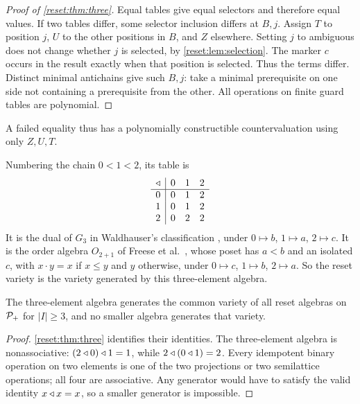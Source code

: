 \begin{proof}[Proof of \cref{reset:thm:three}]
Equal tables give equal selectors and therefore equal values.
If two tables differ, some selector inclusion differs at $B,j$.
Assign $T$ to position $j$, $U$ to the other positions in $B$, and $Z$
elsewhere. Setting $j$ to ambiguous does not change whether $j$ is
selected, by \cref{reset:lem:selection}. The marker $c$ occurs in the
result exactly when that position is selected. Thus the terms differ.
Distinct minimal antichains give such $B,j$: take a minimal prerequisite
on one side not containing a prerequisite from the other. All operations
on finite guard tables are polynomial.
\end{proof}

A failed equality thus has a polynomially constructible countervaluation using only $Z,U,T$.

Numbering the chain $0<1<2$, its table is
\begin{equation}\label{reset:eq:three-table}
\begin{array}{c|ccc}
\mathbin{\triangleleft}&0&1&2\\\hline
0&0&1&2\\
1&0&1&2\\
2&0&2&2
\end{array}
\end{equation}
It is the dual of $G_3$ in Waldhauser's classification \cite[Theorem~3.4, table $G_3$]{Waldhauser2006}, under $0\mapsto b$, $1\mapsto a$, $2\mapsto c$. It is the order algebra $O_{2+1}$ of Freese et al.\ \cite[Section~3]{FreeseEtAl2002}, whose poset has $a<b$ and an isolated $c$, with
$x\cdot y=x$ if $x\leq y$ and $y$ otherwise, under $0\mapsto c$, $1\mapsto b$, $2\mapsto a$. So the reset variety is the variety generated by this three-element algebra.

\begin{corollary}\label{reset:cor:generator}
The three-element algebra generates the common variety of all reset
algebras on $\mathcal P_+$ for $|I|\geq3$, and no smaller algebra generates
that variety.
\end{corollary}
\begin{proof}
\cref{reset:thm:three} identifies their identities. The three-element
algebra is nonassociative:
$(2\mathbin{\triangleleft}0)\mathbin{\triangleleft}1=1$, while $2\mathbin{\triangleleft}(0\mathbin{\triangleleft}1)=2$.
Every idempotent binary operation on two elements is one of the two
projections or two semilattice operations; all four are associative.
Any generator would have to satisfy the valid identity $x\mathbin{\triangleleft} x=x$,
so a smaller generator is impossible.
\end{proof}

